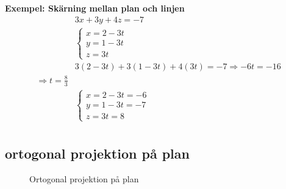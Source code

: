 \begin{multicols}{2}
\textbf{Exempel: Skärning mellan plan och linjen} %
\begin{align*} %
  &3x+3y+4z=-7 \\
  &\left\{\begin{array}{r}
  x = 2-3t \\
  y = 1-3t \\
  z = 3t
  \end{array}\right. \\
  &3(2- 3t)+3(1 -3t)+4(3t)=-7 \Rightarrow -6t=-16  \\
  \Rightarrow t=\frac{8}{3} \\
  &\left\{\begin{array}{r}
  x = 2-3t = -6 \\
  y = 1-3t = -7 \\
  z = 3t = 8 
  \end{array}\right. \\
\end{align*}


\subsection{ortogonal projektion på plan}
\begin{figure}[H]
    \centering
    
    \caption{Ortogonal projektion på plan}
\end{figure}


\end{multicols}
